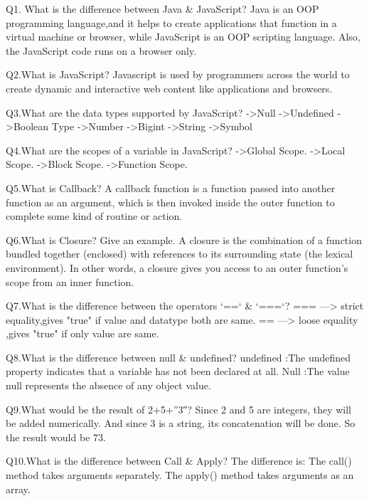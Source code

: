 Q1. What is the difference between Java & JavaScript?
    Java is an OOP programming language,and it helps to create applications that function
in a virtual machine or browser, while JavaScript is an OOP scripting language. Also, the
JavaScript code runs on a browser only.

Q2.What is JavaScript?
   Javascript is used by programmers across the world to create dynamic and interactive 
web content like applications and browsers.



Q3.What are the data types supported by JavaScript?
   ->Null
   ->Undefined
   ->Boolean Type
   ->Number
   ->Bigint
   ->String
   ->Symbol


Q4.What are the scopes of a variable in JavaScript?
    ->Global Scope.
    ->Local Scope.
    ->Block Scope.
    ->Function Scope.


Q5.What is Callback?
   A callback function is a function passed into another function as an argument, which 
is then invoked inside the outer function to complete some kind of routine or action.


Q6.What is Closure? Give an example.
   A closure is the combination of a function bundled together (enclosed) with references
to its surrounding state (the lexical environment). In other words, a closure gives you 
access to an outer function's scope from an inner function.


Q7.What is the difference between the operators ‘==‘ & ‘===‘?
    === —> strict equality,gives "true" if value and datatype both are same.
    == —> loose equality ,gives "true" if only value are same.


Q8.What is the difference between null & undefined?
   undefined :The undefined property indicates that a variable has not been declared at all.
   Null :The value null represents the absence of any object value.


Q9.What would be the result of 2+5+”3″?
   Since 2 and 5 are integers, they will be added numerically. And since 3 is a string, 
its concatenation will be done. So the result would be 73.


Q10.What is the difference between Call & Apply?
    The difference is: The call() method takes arguments separately. The apply() method 
takes arguments as an array.